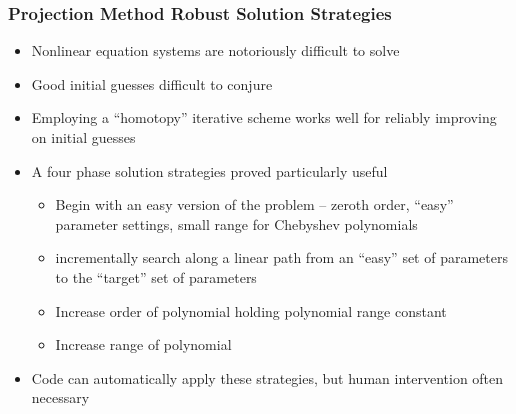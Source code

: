 \documentclass[handout]{beamer}
\begin{document}
\begin{frame}
\frametitle{Projection Method Robust Solution Strategies}
\begin{itemize}
\item Nonlinear equation systems are notoriously difficult to solve
\item Good initial guesses difficult to conjure
\item Employing a ``homotopy'' iterative scheme works well for
  reliably improving on initial guesses
\item A four phase solution strategies proved particularly useful
  \begin{itemize}
  \item Begin with an easy version of the problem -- zeroth order,
    ``easy'' parameter settings, small range for Chebyshev polynomials
  \item incrementally search along a linear path from an ``easy'' set
    of parameters to the ``target'' set of parameters
  \item Increase order of polynomial holding polynomial range constant
  \item Increase range of polynomial
  \end{itemize}
\item Code can automatically apply these strategies, but human
  intervention often necessary
\end{itemize}









\end{frame}
\end{document}
